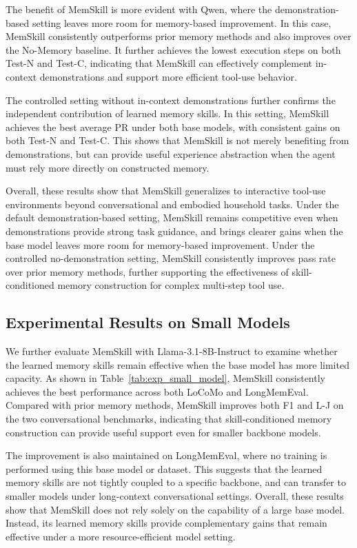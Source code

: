 The benefit of MemSkill is more evident with Qwen, where the demonstration-based setting leaves more room for memory-based improvement. In this case, MemSkill consistently outperforms prior memory methods and also improves over the No-Memory baseline. It further achieves the lowest execution steps on both Test-N and Test-C, indicating that MemSkill can effectively complement in-context demonstrations and support more efficient tool-use behavior.

The controlled setting without in-context demonstrations further confirms the independent contribution of learned memory skills. In this setting, MemSkill achieves the best average PR under both base models, with consistent gains on both Test-N and Test-C. This shows that MemSkill is not merely benefiting from demonstrations, but can provide useful experience abstraction when the agent must rely more directly on constructed memory.

Overall, these results show that MemSkill generalizes to interactive tool-use environments beyond conversational and embodied household tasks. Under the default demonstration-based setting, MemSkill remains competitive even when demonstrations provide strong task guidance, and brings clearer gains when the base model leaves more room for memory-based improvement. Under the controlled no-demonstration setting, MemSkill consistently improves pass rate over prior memory methods, further supporting the effectiveness of skill-conditioned memory construction for complex multi-step tool use.





\subsection{Experimental Results on Small Models}
\label{appendix:small_model}



We further evaluate MemSkill with Llama-3.1-8B-Instruct to examine whether the learned memory skills remain effective when the base model has more limited capacity. As shown in Table~\ref{tab:exp_small_model}, MemSkill consistently achieves the best performance across both LoCoMo and LongMemEval. Compared with prior memory methods, MemSkill improves both F1 and L-J on the two conversational benchmarks, indicating that skill-conditioned memory construction can provide useful support even for smaller backbone models.

The improvement is also maintained on LongMemEval, where no training is performed using this base model or dataset. This suggests that the learned memory skills are not tightly coupled to a specific backbone, and can transfer to smaller models under long-context conversational settings. Overall, these results show that MemSkill does not rely solely on the capability of a large base model. Instead, its learned memory skills provide complementary gains that remain effective under a more resource-efficient model setting.





